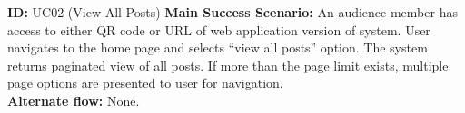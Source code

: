 \textbf{ID:} UC02 (View All Posts)
\textbf{Main Success Scenario:} An audience member has access to either QR code or URL of web application version of system. User navigates to the home page and selects “view all posts” option. The system returns paginated view of all posts. If more than the page limit exists, multiple page options are presented to user for navigation. \\
\textbf{Alternate flow:} None. \\